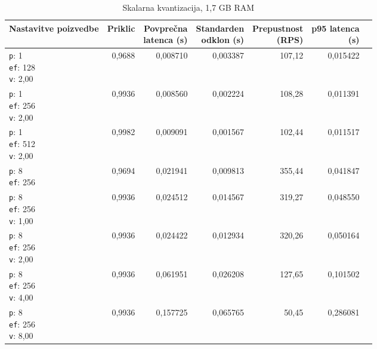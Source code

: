 \begin{table}[htbp]
  \centering
\small
  \caption{Skalarna kvantizacija, 1,7 GB RAM}
  \label{tab:single-2cpu-1.7ram:sq:qdrant-dipl-baseline-tenant-subgraph-sq-ext-m16-ef-128-random-768-100-tenants-extended-upload-2026-08-18-12-17-16.json}
  \begin{tabularx}{\textwidth}{Xrrrrrr}
    \toprule
    Nastavitve poizvedbe & Priklic & \makecell{Povprečna\\latenca (s)} & \makecell{Standarden\\odklon (s)} & \makecell{Prepustnost\\(RPS)} & \makecell{p95 latenca\\(s)}  \\
    \midrule
    \makecell{\texttt{p}: 1\\\texttt{ef}: 128\\\texttt{v}: 2,00} & 0,9688 & 0,008710 & 0,003387 & 107,12 & 0,015422 \\
    \makecell{\texttt{p}: 1\\\texttt{ef}: 256\\\texttt{v}: 2,00} & 0,9936 & 0,008560 & 0,002224 & 108,28 & 0,011391 \\
    \makecell{\texttt{p}: 1\\\texttt{ef}: 512\\\texttt{v}: 2,00} & 0,9982 & 0,009091 & 0,001567 & 102,44 & 0,011517 \\
    \makecell{\texttt{p}: 8\\\texttt{ef}: 256} & 0,9694 & 0,021941 & 0,009813 & 355,44 & 0,041847 \\
    \makecell{\texttt{p}: 8\\\texttt{ef}: 256\\\texttt{v}: 1,00} & 0,9936 & 0,024512 & 0,014567 & 319,27 & 0,048550 \\
    \makecell{\texttt{p}: 8\\\texttt{ef}: 256\\\texttt{v}: 2,00} & 0,9936 & 0,024422 & 0,012934 & 320,26 & 0,050164 \\
    \makecell{\texttt{p}: 8\\\texttt{ef}: 256\\\texttt{v}: 4,00} & 0,9936 & 0,061951 & 0,026208 & 127,65 & 0,101502 \\
    \makecell{\texttt{p}: 8\\\texttt{ef}: 256\\\texttt{v}: 8,00} & 0,9936 & 0,157725 & 0,065765 & 50,45 & 0,286081 \\

\end{tabularx}
\end{table}
